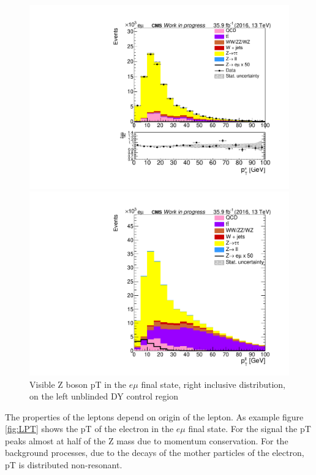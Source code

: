 \begin{figure}[htp]
	\centering

	\begin{multicols}{2}
		\includegraphics[width=\linewidth]{plots/em/DiLepPt_CR.pdf}\par
		\includegraphics[width=\linewidth]{plots/em/DiLepPt_withsignal.pdf}\par
	\end{multicols}

	\caption[Visible Z boson \gls{pT}]{Visible Z boson \gls{pT} in the $e\mu$ final state, right inclusive distribution, on the left unblinded \gls{DY} control region}
	\label{fig:ZPT}
\end{figure}


The properties of the leptons depend on origin of the lepton. As example figure \ref{fig:LPT} shows the \gls{pT} of the electron in the $e\mu$ final state.  For the signal the \gls{pT} peaks almost at half of the Z mass due to momentum conservation. For the background processes, due to the decays of the mother particles of the electron, \gls{pT} is distributed non-resonant. \\


